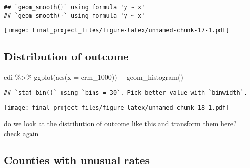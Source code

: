 \documentclass[
]{article}
\newenvironment{Shaded}{\begin{snugshade}}{\end{snugshade}}
\newcommand{\AttributeTok}[1]{\textcolor[rgb]{0.77,0.63,0.00}{#1}}
\newcommand{\DecValTok}[1]{\textcolor[rgb]{0.00,0.00,0.81}{#1}}
\newcommand{\FloatTok}[1]{\textcolor[rgb]{0.00,0.00,0.81}{#1}}
\newcommand{\FunctionTok}[1]{\textcolor[rgb]{0.00,0.00,0.00}{#1}}
\newcommand{\NormalTok}[1]{#1}
\newcommand{\OtherTok}[1]{\textcolor[rgb]{0.56,0.35,0.01}{#1}}
\newcommand{\SpecialCharTok}[1]{\textcolor[rgb]{0.00,0.00,0.00}{#1}}
\begin{document}
\begin{verbatim}
## `geom_smooth()` using formula 'y ~ x'
## `geom_smooth()` using formula 'y ~ x'
\end{verbatim}

\texttt{[image: final\_project\_files/figure-latex/unnamed-chunk-17-1.pdf]}

\hypertarget{distribution-of-outcome}{%
\subsection{Distribution of outcome}\label{distribution-of-outcome}}

\begin{Shaded}
\begin{Highlighting}[]
\NormalTok{cdi }\SpecialCharTok{\%\textgreater{}\%} 
  \FunctionTok{ggplot}\NormalTok{(}\FunctionTok{aes}\NormalTok{(}\AttributeTok{x =}\NormalTok{ crm\_1000)) }\SpecialCharTok{+}
  \FunctionTok{geom\_histogram}\NormalTok{()}
\end{Highlighting}
\end{Shaded}

\begin{verbatim}
## `stat_bin()` using `bins = 30`. Pick better value with `binwidth`.
\end{verbatim}

\texttt{[image: final\_project\_files/figure-latex/unnamed-chunk-18-1.pdf]}

do we look at the distribution of outcome like this and transform them
here? check again

\hypertarget{counties-with-unusual-rates}{%
\subsection{Counties with unusual
rates}\label{counties-with-unusual-rates}}

\begin{Shaded}
\end{Shaded}
\end{document}
